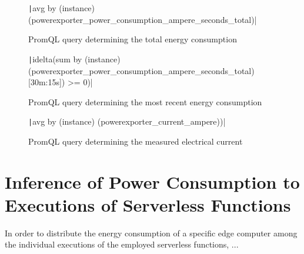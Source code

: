 \begin{figure}[H]
    \centering
        \texttt|avg by (instance) (powerexporter_power_consumption_ampere_seconds_total)|
    \caption{PromQL query determining the total energy consumption}
    \label{promql-total-energy-consumption}
\end{figure}

\begin{figure}[H]
    \centering
        \texttt|idelta(sum by (instance) (powerexporter_power_consumption_ampere_seconds_total)[30m:15s]) >= 0)|
    \caption{PromQL query determining the most recent energy consumption}
    \label{promql-energy-consumption}
\end{figure}

\begin{figure}[H]
    \centering
        \texttt|avg by (instance) (powerexporter_current_ampere))|
    \caption{PromQL query determining the measured electrical current}
    \label{promql-current}
\end{figure}

\section{Inference of Power Consumption to Executions of Serverless Functions}
In order to distribute the energy consumption of a specific edge computer among the individual executions of the employed serverless functions, ...